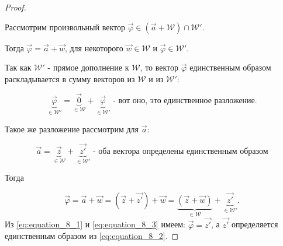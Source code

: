 \begin{proof}~

    Рассмотрим произвольный вектор $\vec{\varphi} \in (\vec{a} + \mathcal{W}) \cap \mathcal{W}'$. 
    
    Тогда $\vec{\varphi} = \vec{a} + \vec{w}$, для некоторого $\vec{w} \in \mathcal{W}$ и $\vec{\varphi} \in \mathcal{W}'$.

    Так как $\mathcal{W}'$ - прямое дополнение к $\mathcal{W}$, то вектор $\vec{\varphi}$ единственным образом раскладывается в сумму векторов из $\mathcal{W}$ и из $\mathcal{W}'$:

    \begin{equation}
        \underbrace{\vec{\varphi}}_{\in \mathcal{W'}} = \underbrace{\vec{0}}_{\in \mathcal{W}} + \underbrace{\vec{\varphi}}_{\in \mathcal{W'}}\text{ - вот оно, это единственное разложение.}
        \label{eq:equation_8_1}
    \end{equation}

    Такое же разложение рассмотрим для $\vec{a}$:

    \begin{equation}
        \vec{a} = \underbrace{\vec{z}}_{\in \mathcal{W}} + \underbrace{\vec{z'}}_{\in \mathcal{W}'}\text{ - оба вектора определены единственным образом}
        \label{eq:equation_8_2}
    \end{equation}
    
    Тогда 

    \begin{equation}
        \vec{\varphi} = \vec{a} + \vec{w} = (\vec{z} + \vec{z'}) + \vec{w} = \underbrace{(\vec{z} + \vec{w})}_{\in \mathcal{W}} + \underbrace{\vec{z'}}_{\in \mathcal{W}'}.
        \label{eq:equation_8_3}
    \end{equation}
    Из \eqref{eq:equation_8_1} и \eqref{eq:equation_8_3} имеем: $\vec{\varphi} = \vec{z'}$, а $\vec{z'}$ определяется единственным образом из \eqref{eq:equation_8_2}.
\end{proof}

